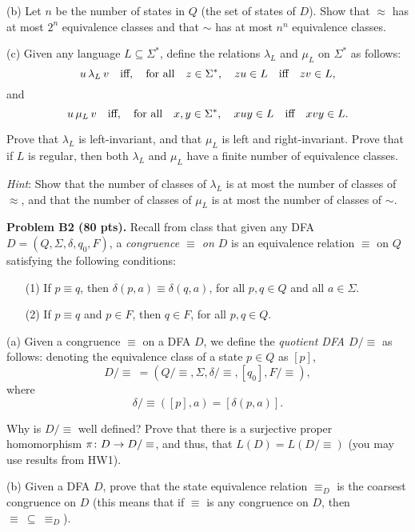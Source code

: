 \documentclass[12pt]{article}
\begin{document}
\medskip
(b) Let $n$ be the number of states in $Q$ (the set of states of $D$).
Show that $\approx$ has at most $2^{n}$ equivalence classes
and that $\sim$ has at most $n^{n}$ equivalence classes.

\medskip
(c) 
Given any language $L\subseteq \Sigma^*$,
define the relations $\lambda_L$ and $\mu_L$ on $\Sigma^{*}$
as follows:
$$u\, \lambda_L\, v\quad\hbox{iff},\quad\hbox{for all}\quad z\in \Sigma^*
,\quad zu \in L\quad\hbox{iff}\quad zv \in L,$$
and
$$u\, \mu_L\, v\quad\hbox{iff},\quad\hbox{for all}\quad x, y\in\Sigma^*,\quad
 xuy \in L\quad\hbox{iff}\quad xvy \in L.$$

\medskip
Prove that $\lambda_L$ is left-invariant, and that
$\mu_L$ is left and right-invariant. Prove that if $L$ is regular,
then both $\lambda_L$ and $\mu_L$ have a finite number of
equivalence classes.

\medskip\noindent
{\it Hint\/}: Show that the number of classes of $\lambda_L$ is at most
the number of classes of $\approx$, and 
that the number of classes of $\mu_L$ is at most
the number of classes of $\sim$.



\vspace{0.5cm}\noindent
{\bf Problem B2 (80 pts).} 
Recall from class that
given any  DFA 
$D = (Q, \Sigma, \delta, q_{0}, F)$,
a {\it congruence $\equiv$ on $D$\/} is an equivalence
relation $\equiv$ on $Q$ satisfying the following
conditions:
\begin{enumerate}
\item[(1)] 
If $p \equiv q$, then $\delta(p, a)\equiv \delta(q, a)$,
for all $p, q\in Q$ and all $a\in \Sigma$.
\item[(2)] 
If $p \equiv q$ and $p\in F$, then $q\in F$,
for all $p, q\in Q$.
\end{enumerate}

\medskip
(a)
Given a congruence $\equiv$ on a DFA $D$, we define
the {\it quotient DFA $D/\equiv$\/} as follows:
denoting the equivalence class of a state $p\in Q$ as $[p]$,
$$D/\equiv\> = (Q/\equiv, \Sigma, \delta/\equiv, [q_0], F/\equiv),$$
where
$$\delta/\equiv([p], a) = [\delta(p, a)].$$

\medskip
Why is $D/\equiv$ well defined? 
Prove that there is a 
surjective proper
homomorphism $\pi\colon D\rightarrow D/\equiv$, and thus,
that $L(D) = L(D/\equiv)$ (you may use results from HW1).

\medskip
(b) Given a DFA $D$, prove that the state equivalence
relation $\equiv_D$ is the coarsest congruence on $D$
(this means that if $\equiv$ is any congruence on $D$,
then $\equiv\>\subseteq\> \equiv_D$).
\end{document}
